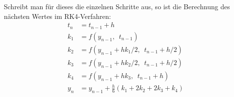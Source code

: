 \documentclass{scrartcl}
\begin{document}
Schreibt man für dieses die einzelnen Schritte aus, so ist die Berechnung des nächsten Wertes im RK4-Verfahren:
\begin{equation}
	\begin{aligned}
		t_n &= t_{n-1} + h \\[0.3cm]
		k_1 &= f\left(y_{n-1},\enspace t_{n-1}\right) \\
		k_2 &= f\left(y_{n-1} + hk_1/2,\enspace t_{n-1} + h/2\right) \\
		k_3 &= f\left(y_{n-1} + hk_2/2,\enspace t_{n-1} + h/2\right) \\
		k_4 &= f\left(y_{n-1} + hk_3,\enspace t_{n-1} + h\right) \\[0.3cm]
		y_n &= y_{n-1} + \tfrac{h}{6}\left(k_1 + 2k_2 + 2k_3 + k_4 \right)
	\end{aligned}
\end{equation}
\newpage
\printbibliography
\end{document}
